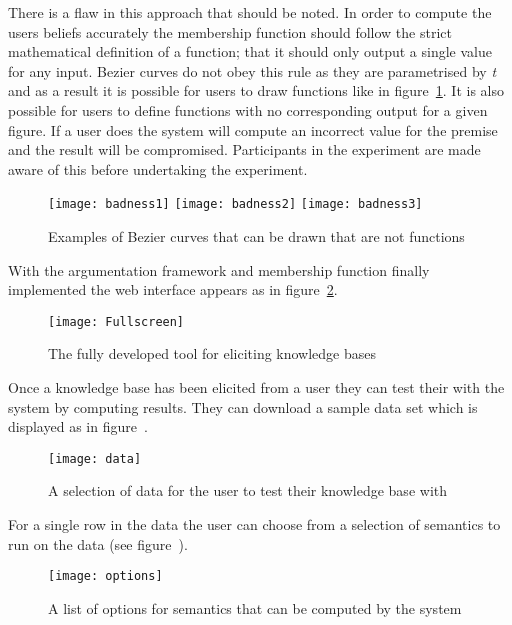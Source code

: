 There is a flaw in this approach that should be noted. In order to compute the users beliefs accurately the membership function should follow the strict mathematical definition of a function; that it should only output a single value for any input. Bezier curves do not obey this rule as they are parametrised by \textit{t} and as a result it is possible for users to draw functions like in figure~\ref{fig:badness}. It is also possible for users to define functions with no corresponding output for a given figure. If a user does the system will compute an incorrect value for the premise and the result will be compromised. Participants in the experiment are made aware of this before undertaking the experiment.

\begin{figure}[h]
\label{fig:badness}
  {\texttt{[image: badness1]}}\hfill
  {\texttt{[image: badness2]}}\hfill
  {\texttt{[image: badness3]}}\hfill
\caption{Examples of Bezier curves that can be drawn that are not functions}
\end{figure}

With the argumentation framework and membership function finally implemented the web interface appears as in figure~\ref{fig:finalUI}.

\begin{figure}[!h]
\label{fig:finalUI}
\centering
\texttt{[image: Fullscreen]}
\caption{The fully developed tool for eliciting knowledge bases}
\end{figure}

Once a knowledge base has been elicited from a user they can test their with the system by computing results. They can download a sample data set which is displayed as in figure~\cite{fig:sampleData}.

\begin{figure}[!h]
\label{fig:sampleData}
\centering
\texttt{[image: data]}
\caption{A selection of data for the user to test their knowledge base with}
\end{figure}

For a single row in the data the user can choose from a selection of semantics to run on the data (see figure~\cite{fig:semantics}).

\begin{figure}[!h]
\label{fig:semantics}
\centering
\texttt{[image: options]}
\caption{A list of options for semantics that can be computed by the system}
\end{figure}

